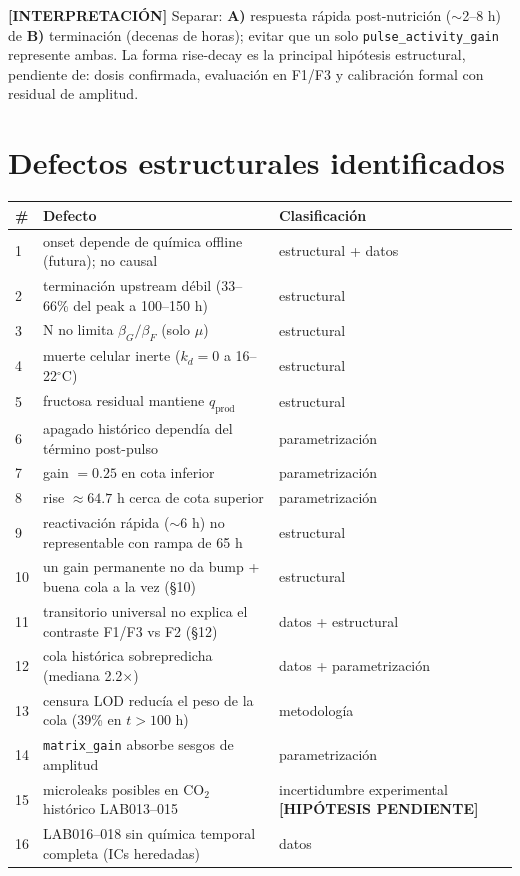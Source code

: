 \documentclass[11pt,a4paper]{article}
\newcommand{\code}[1]{\nolinkurl{#1}}
\newcommand{\interp}{\textcolor{interp}{\textbf{[INTERPRETACI\'ON]}}}
\newcommand{\hipo}{\textcolor{hipo}{\textbf{[HIP\'OTESIS PENDIENTE]}}}
\begin{document}
\interp{} Separar: \textbf{A)} respuesta r\'apida post-nutrici\'on (${\sim}$2--8 h) de \textbf{B)} terminaci\'on (decenas de horas); evitar que un solo \code{pulse_activity_gain} represente ambas. La forma rise-decay es la principal hip\'otesis estructural, pendiente de: dosis confirmada, evaluaci\'on en F1/F3 y calibraci\'on formal con residual de amplitud.

\section{Defectos estructurales identificados}

\begin{table}[h]\centering\small
\begin{tabularx}{\textwidth}{P{0.55cm}L P{3.5cm}}
\toprule
\# & Defecto & Clasificaci\'on \\
 & onset depende de qu\'imica offline (futura); no causal & estructural + datos \\
2 & terminaci\'on upstream d\'ebil (33--66\% del peak a 100--150 h) & estructural \\
3 & N no limita $\beta_G/\beta_F$ (solo $\mu$) & estructural \\
4 & muerte celular inerte ($k_d = 0$ a 16--22$^\circ$C) & estructural \\
5 & fructosa residual mantiene $q_{\mathrm{prod}}$ & estructural \\
6 & apagado hist\'orico depend\'ia del t\'ermino post-pulso & parametrizaci\'on \\
7 & gain $=0.25$ en cota inferior & parametrizaci\'on \\
8 & rise $\approx 64.7$ h cerca de cota superior & parametrizaci\'on \\
9 & reactivaci\'on r\'apida ($\sim$6 h) no representable con rampa de 65 h & estructural \\
10 & un gain permanente no da bump + buena cola a la vez (\S10) & estructural \\
11 & transitorio universal no explica el contraste F1/F3 vs F2 (\S12) & datos + estructural \\
12 & cola hist\'orica sobrepredicha (mediana 2.2$\times$) & datos + parametrizaci\'on \\
13 & censura LOD reduc\'ia el peso de la cola (39\% en $t>100$ h) & metodolog\'ia \\
14 & \code{matrix_gain} absorbe sesgos de amplitud & parametrizaci\'on \\
15 & microleaks posibles en CO$_2$ hist\'orico LAB013--015 & incertidumbre experimental \hipo{} \\
16 & LAB016--018 sin qu\'imica temporal completa (ICs heredadas) & datos \\
\bottomrule
\end{tabularx}
\end{table}
\end{document}
